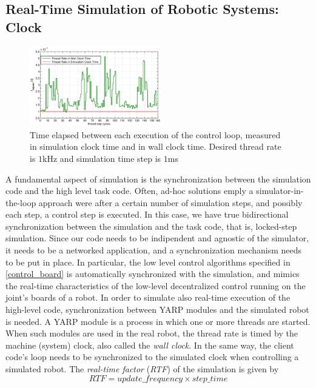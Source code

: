 \subsection{Real-Time Simulation of Robotic Systems: Clock}
\label{sec:simulation_clock}
\begin{figure}
  \centering
    \hspace*{-0.25in}
    \includegraphics[width=0.51\textwidth]{images/yarp_clock.eps}
    \caption{Time elapsed between each execution of the control loop, measured in simulation clock time and in wall clock time. Desired thread rate is $1$kHz and simulation time step is $1$ms}\label{yarp_clock_real_vs_simulated}
\end{figure}
A fundamental aspect of simulation is the synchronization between the simulation code and the high level task code. Often, ad-hoc solutions emply a simulator-in-the-loop approach were after a certain number of simulation steps, and possibly each step, a control step is executed. In this case, we have true bidirectional synchronization between the simulation and the task code, that is, locked-step simulation. Since our code needs to be indipendent and agnostic of the simulator, it needs to be a networked application, and a synchronization mechanism needs to be put in place. In particular, the low level control algorithms specified in \ref{control_board} is automatically synchronized with the simulation, and mimics the real-time characteristics of the low-level decentralized control running on the joint's boards of a robot. In order to simulate also real-time execution of the high-level code, synchronization between YARP modules and the simulated robot is needed.
A YARP module is a process in which one or more threads are started. When such modules are used in the real robot, the thread rate is timed by the machine (system) clock, also called the \emph{wall clock}. In the same way, the client code's loop needs to be synchronized to the simulated clock when controlling a simulated robot.
The \emph{real-time factor} (\emph{RTF}) of the simulation is given by 
\begin{equation}
    RTF = update\_frequency \times step\_time
\end{equation}
